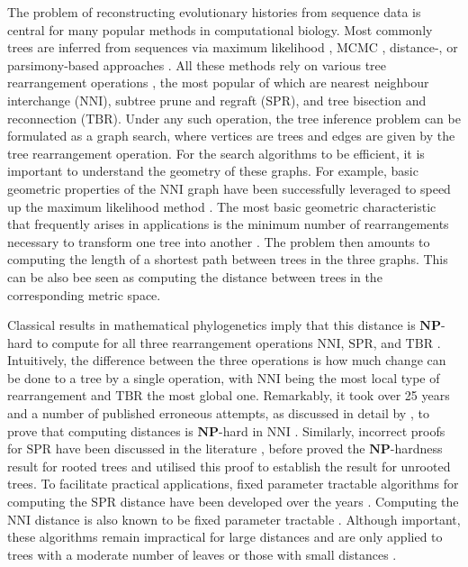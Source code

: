 \documentclass[11pt]{amsart}
\newcommand{\nni}{\mathrm{NNI}}
\newcommand{\spr}{\mathrm{SPR}}
\newcommand{\tbr}{\mathrm{TBR}}
\newcommand{\np}{\mathbf{NP}}
\begin{document}
The problem of reconstructing evolutionary histories from sequence data is central for many popular methods in computational biology.
Most commonly trees are inferred from sequences via maximum likelihood \autocite{Stamatakis2006-xb, Guindon2010-lo}, MCMC \autocite{Ronquist2003-eq, Suchard2018-tw, Bouckaert2019-yr}, distance-, or parsimony-based approaches \autocite{Tamura2011-ky}.
All these methods rely on various tree rearrangement operations \autocite{Semple2003-nj}, the most popular of which are nearest neighbour interchange ($\nni$), subtree prune and regraft ($\spr$), and tree bisection and reconnection ($\tbr$).
Under any such operation, the tree inference problem can be formulated as a graph search, where vertices are trees and edges are given by the tree rearrangement operation.
For the search algorithms to be efficient, it is important to understand the geometry of these graphs.
For example, basic geometric properties of the $\nni$ graph have been successfully leveraged to speed up the maximum likelihood method \autocite{Nguyen2015-sp}.
The most basic geometric characteristic that frequently arises in applications is the minimum number of rearrangements necessary to transform one tree into another \autocite{Semple2003-nj}.
The problem then amounts to computing the length of a shortest path between trees in the three graphs.
This can be also bee seen as computing the distance between trees in the corresponding metric space.

Classical results in mathematical phylogenetics imply that this distance is $\np$-hard to compute for all three rearrangement operations $\nni$, $\spr$, and $\tbr$ \autocite{Dasgupta2000-xa, Bordewich2005-nx, Hickey2008-wv, Allen2001-ky}.
Intuitively, the difference between the three operations is how much change can be done to a tree by a single operation, with $\nni$ being the most local type of rearrangement and $\tbr$ the most global one.
Remarkably, it took over 25 years and a number of published erroneous attempts, as discussed in detail by \textcite{Dasgupta2000-xa}, to prove that computing distances is $\np$-hard in $\nni$ \autocite{Dasgupta2000-xa}.
Similarly, incorrect proofs for $\spr$ have been discussed in the literature \autocite{Hein1996-em, Allen2001-ky}, before \textcite{Bordewich2005-nx} proved the $\np$-hardness result for rooted trees and \textcite{Hickey2008-wv} utilised this proof to establish the result for unrooted trees.
To facilitate practical applications, fixed parameter tractable algorithms \autocite{Downey2013-nd} for computing the $\spr$ distance have been developed over the years \autocite{Whidden2010-bw, Bordewich2005-nx, Whidden2018-fw}.
Computing the $\nni$ distance is also known to be fixed parameter tractable \autocite{DasGupta1999-xf}.
Although important, these algorithms remain impractical for large distances and are only applied to trees with a moderate number of leaves or those with small distances \autocite{Whidden2018-fw}.
\end{document}
